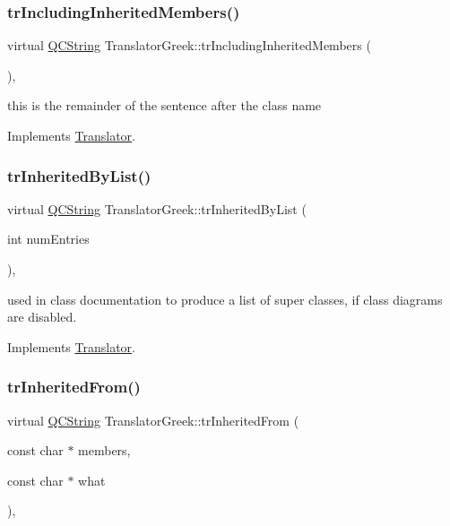 \subsubsection{\texorpdfstring{trIncludingInheritedMembers()}{trIncludingInheritedMembers()}}
{\footnotesize\ttfamily virtual \mbox{\hyperlink{class_q_c_string}{Q\+C\+String}} Translator\+Greek\+::tr\+Including\+Inherited\+Members (\begin{DoxyParamCaption}{ }\end{DoxyParamCaption})\hspace{0.3cm}{\ttfamily [inline]}, {\ttfamily [virtual]}}

this is the remainder of the sentence after the class name 

Implements \mbox{\hyperlink{class_translator}{Translator}}.

\mbox{\label{class_translator_greek_a27fc0764a3c58e99d12159432a7f38cb}} 
\subsubsection{\texorpdfstring{trInheritedByList()}{trInheritedByList()}}
{\footnotesize\ttfamily virtual \mbox{\hyperlink{class_q_c_string}{Q\+C\+String}} Translator\+Greek\+::tr\+Inherited\+By\+List (\begin{DoxyParamCaption}\item[{int}]{num\+Entries }\end{DoxyParamCaption})\hspace{0.3cm}{\ttfamily [inline]}, {\ttfamily [virtual]}}

used in class documentation to produce a list of super classes, if class diagrams are disabled. 

Implements \mbox{\hyperlink{class_translator}{Translator}}.

\mbox{\label{class_translator_greek_ac8f28d145edbab7e7498ba47ab89025e}} 
\subsubsection{\texorpdfstring{trInheritedFrom()}{trInheritedFrom()}}
{\footnotesize\ttfamily virtual \mbox{\hyperlink{class_q_c_string}{Q\+C\+String}} Translator\+Greek\+::tr\+Inherited\+From (\begin{DoxyParamCaption}\item[{const char $\ast$}]{members,  }\item[{const char $\ast$}]{what }\end{DoxyParamCaption})\hspace{0.3cm}{\ttfamily [inline]}, {\ttfamily [virtual]}}

